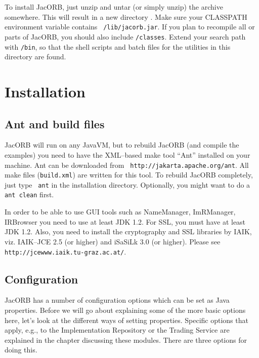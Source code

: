 \documentclass[12pt]{scrbook}
\begin{document}
To install JacORB, just unzip  and untar (or simply unzip) the archive
somewhere.  This will result  in a new directory {\tt \JacORBDir}.
Make   sure  your   CLASSPATH  environment   variable   contains  {\tt
\JacORBDir/lib/jacorb.jar}.  If you plan to recompile all or parts
of  JacORB,  you  should  also include  {\tt  \JacORBDir/classes}.
Extend  your search path  with {\tt  \JacORBDir/bin}, so  that the
shell scripts and batch files  for the utilities in this directory are
found.

\section{Installation}
\label{Sec_installation}

\subsection{Ant and build files}

JacORB will run on any JavaVM,  but to rebuild JacORB (and compile the
 examples) you need to have the XML--based make tool ``Ant'' installed
 on    your   machine.    Ant    can   be    downloaded   from    {\tt
 http://jakarta.apache.org/ant}. All make  files ({\tt build.xml}) are
 written for this  tool. To rebuild JacORB completely,  just type {\tt
 ant} in the installation directory.  Optionally, you might want to do
 a {\tt ant clean} first.

In order to be able to  use GUI tools such as NameManager, ImRManager,
IRBrowser you need to use at least  JDK 1.2. For SSL, you must have at
least JDK  1.2.  Also,  you need to  install the cryptography  and SSL
libraries by IAIK, viz.  IAIK--JCE 2.5 (or higher) and iSaSiLk 3.0 (or
higher).  Please see {\tt http://jcewww.iaik.tu-graz.ac.at/}.

\subsection{Configuration}

JacORB has a number of configuration  options which can be set as Java
properties.  Before we will go about explaining some of the more basic
options   here,  let's  look   at  the   different  ways   of  setting
properties. Specific  options that apply, e.g.,  to the Implementation
Repository  or  the  Trading  Service  are explained  in  the  chapter
discussing these modules. There are three options for doing this.
\end{document}
